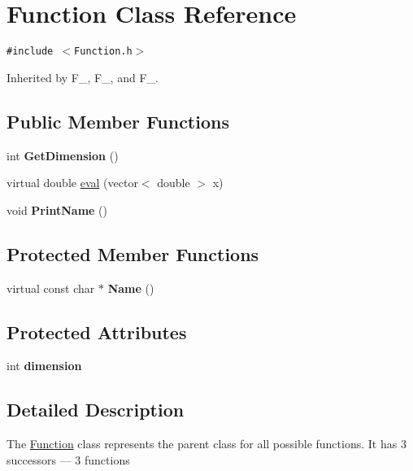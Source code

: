 \hypertarget{class_function}{
\section{Function Class Reference}
\label{class_function}
}
{\tt \#include $<$Function.h$>$}

Inherited by F\_, F\_, and F\_.

\subsection*{Public Member Functions}
\begin{CompactItemize}
\item 
\hypertarget{class_function_e757fa3d662e77e22431849f9d3b4bb6}{
int \textbf{GetDimension} ()}
\label{class_function_e757fa3d662e77e22431849f9d3b4bb6}

\item 
virtual double \hyperlink{class_function_3bf8e78d5e96e6772b9ebd3c81cbb50f}{eval} (vector$<$ double $>$ x)
\item 
\hypertarget{class_function_dd31fc36166f55bfa39f269427b02fe5}{
void \textbf{PrintName} ()}
\label{class_function_dd31fc36166f55bfa39f269427b02fe5}

\end{CompactItemize}
\subsection*{Protected Member Functions}
\begin{CompactItemize}
\item 
\hypertarget{class_function_a3330e514b21eeba810615f590009caa}{
virtual const char $\ast$ \textbf{Name} ()}
\label{class_function_a3330e514b21eeba810615f590009caa}

\end{CompactItemize}
\subsection*{Protected Attributes}
\begin{CompactItemize}
\item 
\hypertarget{class_function_34389a90187d7108575edace3b85b80e}{
int \textbf{dimension}}
\label{class_function_34389a90187d7108575edace3b85b80e}

\end{CompactItemize}


\subsection{Detailed Description}
The \hyperlink{class_function}{Function} class represents the parent class for all possible functions. It has 3 successors --- 3 functions 

